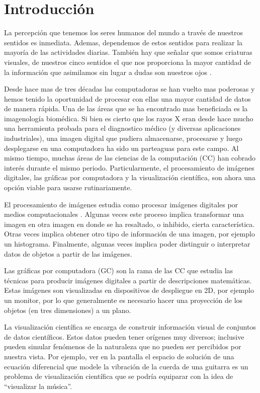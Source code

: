 \chapter*{Introducción}

La percepción que tenemos los seres humanos del mundo a través de nuestros sentidos es inmediata. Ademas, dependemos de estos sentidos para realizar la mayoría de las actividades diarias. También hay que señalar que somos criaturas visuales, de nuestros cinco sentidos el que nos proporciona la mayor cantidad de la información que asimilamos sin lugar a dudas son nuestros ojos \cite{Hagen:vista}.

Desde hace mas de tres décadas las computadoras se han vuelto mas poderosas y hemos tenido la oportunidad de procesar con ellas una mayor cantidad de datos de manera rápida. Una de las áreas que se ha encontrado mas beneficiada es la imagenología biomédica. Si bien es cierto que los rayos X eran desde hace mucho una herramienta probada para el diagnostico médico (y diversas aplicaciones industriales), una imagen digital que pudiera almacenarse, procesarse y luego desplegarse en una computadora ha sido un parteaguas para este campo. Al mismo tiempo, muchas áreas de las ciencias de la computación (CC) han cobrado interés durante el mismo periodo. Particularmente, el procesamiento de imágenes digitales, las gráficas por computadora y la visualización científica, son ahora una opción viable para usarse rutinariamente.

El procesamiento de imágenes estudia como procesar imágenes digitales por medios computacionales \cite{Gonzalez:ImagenesDigitales}. Algunas veces este proceso implica transformar una imagen en otra imagen en donde se ha resaltado, o inhibido, cierta característica. Otras veces implica obtener otro tipo de información de una imagen, por ejemplo un histograma. Finalmente, algunas veces implica poder distinguir o interpretar datos de objetos a partir de las imágenes.

Las gráficas por computadora (GC) son la rama de las CC que estudia las técnicas para producir imágenes digitales a partir de descripciones matemáticas. Estas imágenes son visualizadas en dispositivos de despliegue en 2D, por ejemplo un monitor, por lo que generalmente es necesario hacer una proyección de los objetos (en tres dimensiones) a un plano.

La visualización científica se encarga de construir información visual de conjuntos de datos científicos. Estos datos pueden tener orígenes muy diversos; inclusive pueden simular fenómenos de la naturaleza que no pueden ser percibidos por nuestra vista. Por ejemplo, ver en la pantalla el espacio de solución de una ecuación diferencial que modele la vibración de la cuerda de una guitarra es un problema de visualización científica que se podría equiparar con la idea de ``visualizar la música''.

